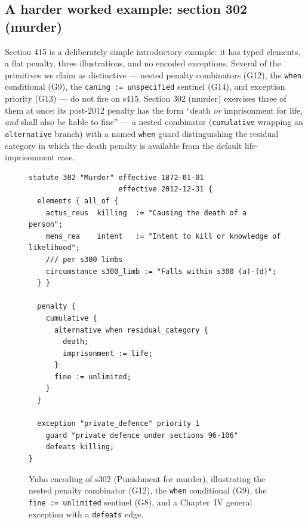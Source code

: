 \subsection{A harder worked example: section 302 (murder)}
\label{subsec:s302}

Section 415 is a deliberately simple introductory example: it has typed
elements, a flat penalty, three illustrations, and no encoded
exceptions. Several of the primitives we claim as distinctive --- nested
penalty combinators (\textsf{G12}), the \texttt{when} conditional
(\textsf{G9}), the \texttt{caning := unspecified} sentinel
(\textsf{G14}), and exception priority (\textsf{G13}) --- do not fire on
s415. Section 302 (murder) exercises three of them at once: its
post-2012 penalty has the form ``death \emph{or} imprisonment for life,
\emph{and} shall also be liable to fine'' --- a nested combinator
(\texttt{cumulative} wrapping an \texttt{alternative} branch) with a
named \texttt{when} guard distinguishing the residual category in which
the death penalty is available from the default life-imprisonment case.

\begin{figure}[!htbp]
\begin{lstlisting}[language=yuho,basicstyle=\ttfamily\scriptsize]
statute 302 "Murder" effective 1872-01-01
                     effective 2012-12-31 {
  elements { all_of {
    actus_reus  killing  := "Causing the death of a person";
    mens_rea    intent   := "Intent to kill or knowledge of likelihood";
    /// per s300 limbs
    circumstance s300_limb := "Falls within s300 (a)-(d)";
  } }

  penalty {
    cumulative {
      alternative when residual_category {
        death;
        imprisonment := life;
      }
      fine := unlimited;
    }
  }

  exception "private_defence" priority 1
    guard "private defence under sections 96-106"
    defeats killing;
}
\end{lstlisting}
\caption{Yuho encoding of s302 (Punishment for murder), illustrating
the nested penalty combinator (\textsf{G12}), the \texttt{when}
conditional (\textsf{G9}), the \texttt{fine := unlimited} sentinel
(\textsf{G8}), and a Chapter~IV general exception with a
\texttt{defeats} edge.}
\label{fig:s302}
\end{figure}

